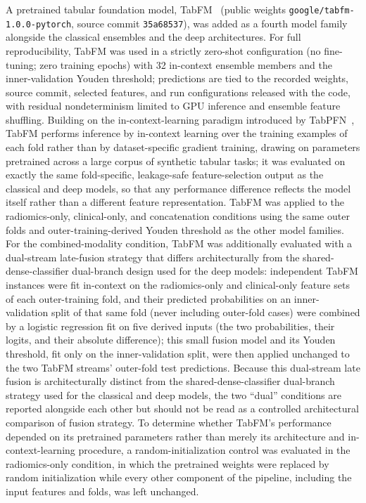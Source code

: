 \documentclass[11pt]{article}
\begin{document}
A pretrained tabular foundation model, TabFM~\citep{kong2026tabfm}
(public weights \texttt{google/tabfm-1.0.0-pytorch}, source commit
\texttt{35a68537}), was added as a fourth model
family alongside the classical ensembles and the deep architectures. For full
reproducibility, TabFM was used in a strictly zero-shot configuration (no
fine-tuning; zero training epochs) with 32 in-context ensemble members and the
inner-validation Youden threshold; predictions are tied to the recorded weights,
source commit, selected features, and run configurations released with the code,
with residual nondeterminism limited to GPU inference and ensemble feature
shuffling. Building on
the in-context-learning paradigm introduced by
TabPFN~\citep{hollmann2025tabpfn}, TabFM
performs inference by in-context learning over the training examples of each
fold rather than by dataset-specific gradient training, drawing on parameters
pretrained across a large corpus of synthetic tabular tasks; it was
evaluated on exactly the same fold-specific, leakage-safe feature-selection
output as the classical and deep models, so that any performance difference
reflects the model itself rather than a different feature representation.
TabFM was applied to the radiomics-only, clinical-only, and concatenation
conditions using the same outer folds and outer-training-derived Youden
threshold as the other model families. For the combined-modality condition,
TabFM was additionally evaluated with a dual-stream late-fusion strategy that
differs architecturally from the shared-dense-classifier dual-branch design
used for the deep models: independent TabFM instances were fit in-context on
the radiomics-only and clinical-only feature sets of each outer-training fold,
and their predicted probabilities on an inner-validation split of that same
fold (never including outer-fold cases) were combined by a logistic regression
fit on five derived inputs (the two probabilities, their logits, and their
absolute difference); this small fusion model and its Youden threshold, fit
only on the inner-validation split, were then applied unchanged to the two
TabFM streams' outer-fold test predictions. Because this dual-stream late
fusion is architecturally distinct from the shared-dense-classifier dual-branch
strategy used for the classical and deep models, the two ``dual'' conditions
are reported alongside each other but should not be read as a controlled
architectural comparison of fusion strategy. To determine whether TabFM's performance depended
on its pretrained parameters rather than merely its architecture and
in-context-learning procedure, a random-initialization control was evaluated in
the radiomics-only condition, in which the pretrained weights were replaced by
random initialization while every other component of the pipeline, including
the input features and folds, was left unchanged.
\end{document}
